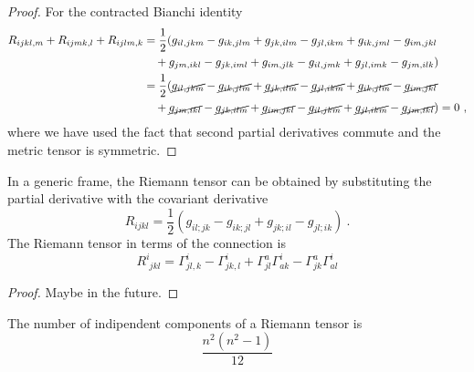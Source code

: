 \begin{proof}
        For the contracted Bianchi identity 
        \begin{equation*}
        \begin{aligned}
            R_{ijkl,m} + R_{ijmk,l} + R_{ijlm,k} & = \frac{1}{2} (g_{il,jkm} - g_{ik,jlm} + g_{jk,ilm} - g_{jl,ikm} + g_{ik,jml} - g_{im,jkl} \\ & \quad + g_{jm,ikl} - g_{jk,iml} + g_{im,jlk} - g_{il,jmk} + g_{jl,imk} - g_{jm,ilk} ) \\ & = \frac{1}{2} (\cancel{g_{il,jkm}} - \cancel{g_{ik,jlm}} + \cancel{g_{jk,ilm}} - \cancel{g_{jl,ikm}} + \cancel{g_{ik,jlm}} - \cancel{g_{im,jkl}} \\ & \quad + \cancel{g_{jm,ikl}} - \cancel{g_{jk,ilm}} +\cancel{g_{im,jkl}} - \cancel{g_{il,jkm}} + \cancel{g_{jl,ikm}} - \cancel{g_{jm,ikl}}) = 0 ~,
        \end{aligned}
        \end{equation*}
        where we have used the fact that second partial derivatives commute and the metric tensor is symmetric.
    \end{proof}
    In a generic frame, the Riemann tensor can be obtained by substituting the partial derivative with the covariant derivative 
    \begin{equation}\label{riemanmetric}
        R_{ijkl} = \frac{1}{2} (g_{il;jk} - g_{ik;jl} + g_{jk;il} - g_{jl;ik}) ~.
    \end{equation}
    The Riemann tensor in terms of the connection is 
    \begin{equation}\label{rieconn}
        R^i_{\phantom i jkl} = \Gamma^i_{jl,k} - \Gamma^i_{jk,l} + \Gamma^a_{jl} \Gamma^i_{ak} - \Gamma^a_{jk} \Gamma^i_{al}
    \end{equation}
    \begin{proof}
        Maybe in the future.
    \end{proof}
    The number of indipendent components of a Riemann tensor is 
    \begin{equation*}
        \frac{n^2 (n^2 - 1)}{12}
    \end{equation*}
